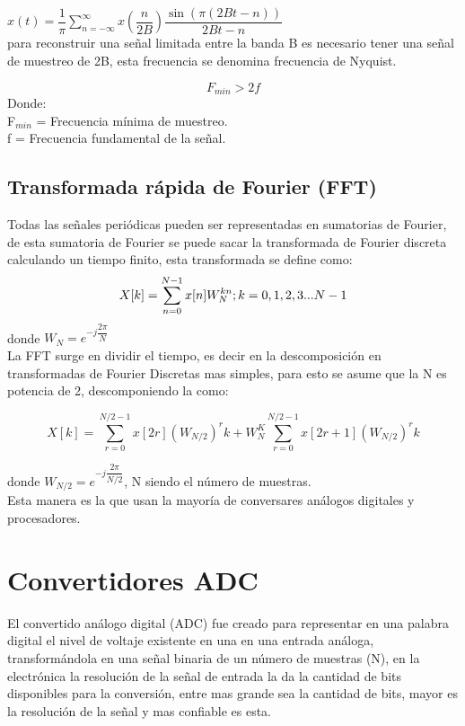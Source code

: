 $x(t)=\dfrac{1}{\pi}\sum_{n=-\infty}^{\infty} x(\dfrac{n}{2B})\dfrac{\sin(\pi(2Bt-n)) }{2Bt-n}$
\cite{A35}\\

para reconstruir una señal limitada entre la banda B es necesario tener una señal de muestreo de 2B, esta frecuencia se denomina frecuencia de Nyquist.

\begin{equation}
F_{min}>2f
\end{equation}
Donde:\\
F$_{min}$ = Frecuencia mínima de muestreo.\\
f = Frecuencia fundamental de la señal.

\subsection{Transformada rápida de Fourier (FFT) }
Todas las señales periódicas pueden ser representadas en sumatorias de Fourier, de esta sumatoria de Fourier se puede sacar la transformada de Fourier discreta calculando un tiempo finito, esta transformada se define como:
\begin{equation}
X[k]=\sum_{n=0}^{N-1}x[n]W_{N}^{kn} ; \\   k = 0,1,2,3...N-1
\end{equation}
donde $W_{N}=e^{-j\dfrac{2\pi}{N}}$\\
La FFT surge en dividir el tiempo, es decir en la descomposición en transformadas de Fourier Discretas mas simples, para esto se asume que la N es potencia de 2, descomponiendo la como: 

\begin{equation}
X[k]=\sum_{r=0}^{N/2-1}x[2r](W_{N/2})^rk + W_{N}^K \sum_{r=0}^{N/2-1}x[2r+1](W_{N/2})^rk
\end{equation}

donde $W_{N/2}=e^{-j\dfrac{2\pi}{N/2}}$, N siendo el número de muestras. \cite{A36}\\

Esta manera es la que usan la mayoría de conversares análogos digitales y procesadores. 


\section{Convertidores ADC}
El convertido análogo digital (ADC) fue creado para representar en una palabra digital el nivel de voltaje existente en una en una entrada análoga, transformándola en una señal binaria de un número de muestras (N), en la electrónica la resolución de la señal de entrada la da la cantidad de bits disponibles para la conversión, entre mas grande sea la cantidad de bits, mayor es la resolución de la señal y mas confiable es esta. 